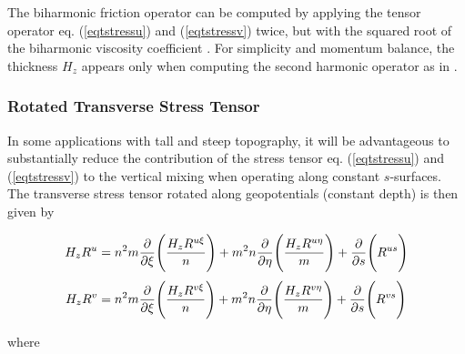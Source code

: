 The biharmonic friction operator can be computed by applying the tensor
operator eq. (\ref{eqtstressu}) and (\ref{eqtstressv}) twice, but with
the squared root of the biharmonic viscosity coefficient
\citep{Griffies_2000}.  For simplicity and momentum
balance, the thickness $H_{z}$ appears only when computing the second
harmonic operator as in \citet{Griffies_2000}.

\subsubsection{Rotated Transverse Stress Tensor}

In some applications with tall and steep topography, it
will be advantageous to substantially reduce the contribution of the
stress tensor eq. (\ref{eqtstressu}) and (\ref{eqtstressv}) to
the vertical mixing when operating along constant $s$-surfaces.
The transverse stress tensor rotated along geopotentials (constant depth)
is then given by

\begin{align}
      H_{z}R^{u} &= {n^2}m {\pder{}{\xi}}  \Biggl(
\frac{H_{z}R^{u\xi}} {n} \Biggr) +
                    {m^2}n {\pder{}{\eta}} \Biggl(
\frac{H_{z}R^{u\eta}}{m} \Biggr) +
                           {\pder{}{s}}    \Biggl( R^{us} \Biggr)
\label{eqrstressu}
\\
   \noalign{\smallskip}
      H_{z}R^{v} &= {n^2}m {\pder{}{\xi}}  \Biggl(
\frac{H_{z}R^{v\xi}} {n} \Biggr) +
                    {m^2}n {\pder{}{\eta}} \Biggl(
\frac{H_{z}R^{v\eta}}{m} \Biggr) +
                           {\pder{}{s}}    \Biggl( R^{vs} \Biggr)
\label{eqrstressv}
\end{align}

where

